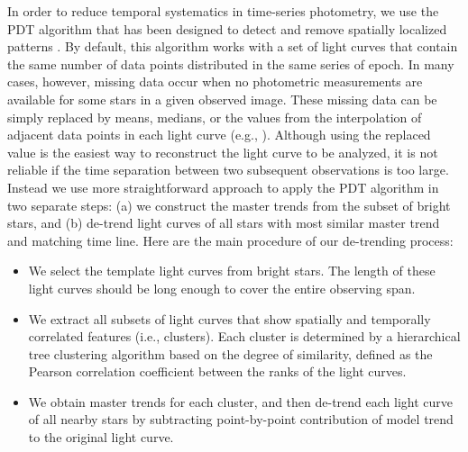 In order to reduce temporal systematics in time-series photometry, we use the PDT algorithm that has been designed to detect and remove spatially localized patterns \citep{kim09}.  By default, this algorithm works with a set of light curves that contain the same number of data points distributed in the same series of epoch.  In many cases, however, missing data occur when no photometric measurements are available for some stars in a given observed image.  These missing data can be simply replaced by means, medians, or the values from the interpolation of adjacent data points in each light curve (e.g., \citealt{kov05, kim10}).  Although using the replaced value is the easiest way to reconstruct the light curve to be analyzed, it is not reliable if the time separation between two subsequent observations is too large.  Instead we use more straightforward approach to apply the PDT algorithm in two separate steps: (a) we construct the master trends from the subset of bright stars, and (b) de-trend light curves of all stars with most similar master trend and matching time line.  Here are the main procedure of our de-trending process: \begin{itemize}
\item{We select the template light curves from bright stars.  The length of these light curves should be long enough to cover the entire observing span.}

\item{We extract all subsets of light curves that show spatially and temporally correlated features (i.e., clusters).  Each cluster is determined by a hierarchical tree clustering algorithm based on the degree of similarity, defined as the Pearson correlation coefficient between the ranks of the light curves.}

\item{We obtain master trends for each cluster, and then de-trend each light curve of all nearby stars by subtracting point-by-point contribution of model trend to the original light curve.}
\end{itemize} 


